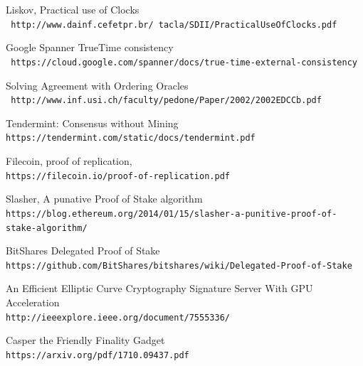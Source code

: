 \documentclass[12pt]{article}
\begin{document}
\begin{thebibliography}{9}
Liskov, Practical use of Clocks
\\\texttt{ http://www.dainf.cefetpr.br/~tacla/SDII/PracticalUseOfClocks.pdf}

Google Spanner TrueTime consistency
\\\texttt{ https://cloud.google.com/spanner/docs/true-time-external-consistency}

Solving Agreement with Ordering Oracles
\\\texttt{ http://www.inf.usi.ch/faculty/pedone/Paper/2002/2002EDCCb.pdf}

Tendermint: Consensus without Mining
\\\texttt{https://tendermint.com/static/docs/tendermint.pdf}

Filecoin, proof of replication,
\\\texttt{https://filecoin.io/proof-of-replication.pdf}

Slasher, A punative Proof of Stake algorithm
\\\texttt{https://blog.ethereum.org/2014/01/15/slasher-a-punitive-proof-of-stake-algorithm/}

BitShares Delegated Proof of Stake
\\\texttt{https://github.com/BitShares/bitshares/wiki/Delegated-Proof-of-Stake}

An Efficient Elliptic Curve Cryptography Signature Server With GPU Acceleration
\\\texttt{http://ieeexplore.ieee.org/document/7555336/}

Casper the Friendly Finality Gadget
\\\texttt{https://arxiv.org/pdf/1710.09437.pdf}
\end{thebibliography}
\end{document}
